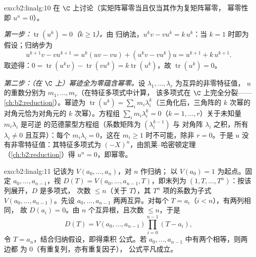 \begin{solution}{exo:b2:linalg:10}
在 $\C$ 上讨论（实矩阵幂零当且仅当其作为复矩阵幂零，
幂零性即 $u^n = 0$）。

\emph{第一步：$\operatorname{tr}(u^k) = 0$（$k \geq 1$）。}由
归纳法，$u^k v - v u^k = k\, u^k$：当 $k = 1$ 时即为
假设；归纳步为
\[
u^{k+1}v - vu^{k+1} = u^k(uv - vu) + (u^k v - v u^k)u
= u^{k+1} + k\,u^{k+1} .
\]
取迹得：$0 = \operatorname{tr}(u^k v) -
\operatorname{tr}(vu^k) = k \operatorname{tr}(u^k)$，故
$\operatorname{tr}(u^k) = 0$。

\emph{第二步：（在 $\C$ 上）幂迹全为零蕴含幂零。}设
$\lambda_1, \dots, \lambda_r$ 为互异的非零特征值，
$u$ 的重数分别为 $m_1, \dots, m_r$（在特征多项式中计算，
该多项式在 $\C$ 上完全分裂——
\cref{ch:b2:reduction}）。幂迹为 $\operatorname{tr}(u^k) =
\sum_i m_i \lambda_i^k$（三角化后，三角阵的
$k$ 次幂的对角元恰为对角元的 $k$ 次幂）。方程组 $\sum_i m_i
\lambda_i^k = 0$（$k = 1, \dots, r$）关于未知量 $m_i\lambda_i$ 是可逆
的范德蒙型方程组（系数矩阵为 $(\lambda_i^{k-1})$ 与
对角阵 $\lambda_i$ 之积，所有 $\lambda_i \neq 0$ 且互异）：每个 $m_i
\lambda_i = 0$，这在 $m_i \geq 1$ 时不可能，除非 $r = 0$。于是 $u$
没有非零特征值：其特征多项式为
$(-X)^n$，由凯莱–哈密顿定理（\cref{ch:b2:reduction}）得 $u^n
= 0$，即幂零。
\end{solution}

\begin{solution}{exo:b2:linalg:11}
记该为 $V(a_0, \dots, a_n)$，对 $n$ 作归纳；
以 $V(a_0) = 1$ 为起点。固定 $a_0, \dots, a_{n-1}$，视 $D(T) =
V(a_0, \dots, a_{n-1}, T)$，即末列为 $(1,
T, \dots, T^n)$：按该列展开，$D$ 是多项式，
次数 $\leq n$（关于 $T$），其 $T^n$ 项的系数为子式
$V(a_0, \dots, a_{n-1})$。先设 $a_0, \dots,
a_{n-1}$ 两两互异。对每个 $T = a_i$（$i < n$），有两列相同，
故 $D(a_i) = 0$。由 $n$ 个互异根，且次数
$\leq n$，于是
\[
D(T) = V(a_0, \dots, a_{n-1}) \prod_{i=0}^{n-1}(T - a_i),
\]
令 $T = a_n$，结合归纳假设，即得乘积
公式。若 $a_0, \dots, a_{n-1}$ 中有两个相等，则两边都
为 $0$（有重复列，亦有重复因子），
公式平凡成立。
\end{solution}

